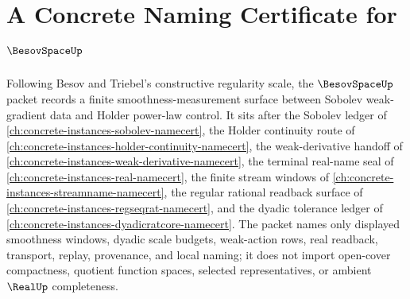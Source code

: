 \chapter{A Concrete Naming Certificate for $\BesovSpaceUp$}
\label{ch:concrete-instances-besov-space-namecert}

Following Besov and Triebel's constructive regularity scale, the $\BesovSpaceUp$ packet records a finite smoothness-measurement surface between Sobolev weak-gradient data and Holder power-law control. It sits after the Sobolev ledger of \autoref{ch:concrete-instances-sobolev-namecert}, the Holder continuity route of \autoref{ch:concrete-instances-holder-continuity-namecert}, the weak-derivative handoff of \autoref{ch:concrete-instances-weak-derivative-namecert}, the terminal real-name seal of \autoref{ch:concrete-instances-real-namecert}, the finite stream windows of \autoref{ch:concrete-instances-streamname-namecert}, the regular rational readback surface of \autoref{ch:concrete-instances-regseqrat-namecert}, and the dyadic tolerance ledger of \autoref{ch:concrete-instances-dyadicratcore-namecert}. The packet names only displayed smoothness windows, dyadic scale budgets, weak-action rows, real readback, transport, replay, provenance, and local naming; it does not import open-cover compactness, quotient function spaces, selected representatives, or ambient $\RealUp$ completeness.

